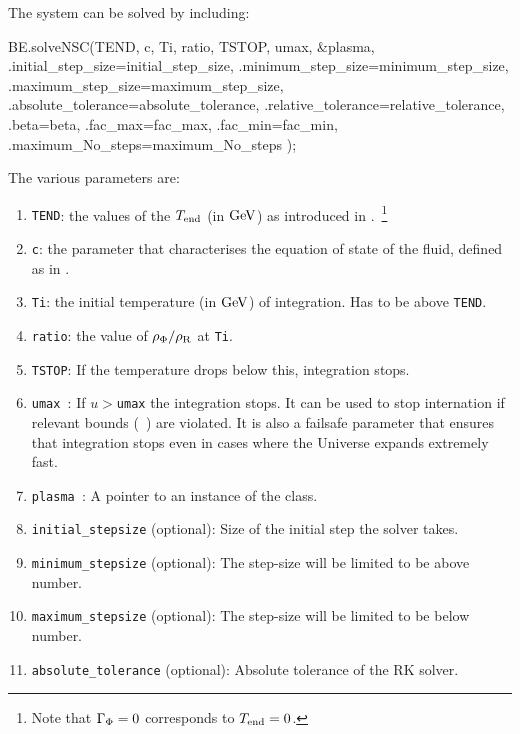 \documentclass[11pt,a4paper]{article}
\begin{document}
The system can be solved by including:
%
\begin{cpp}
	BE.solveNSC(TEND, c, Ti, ratio, TSTOP, umax, &plasma,
				 	 {
					 .initial_step_size=initial_step_size, .minimum_step_size=minimum_step_size,
					 .maximum_step_size=maximum_step_size, .absolute_tolerance=absolute_tolerance, 
					 .relative_tolerance=relative_tolerance, .beta=beta, 
					 .fac_max=fac_max, .fac_min=fac_min, .maximum_No_steps=maximum_No_steps
					 }
					);
\end{cpp}
%
The various parameters are:
%
\begin{enumerate}
	\item {\tt TEND}: the values of the $T_{\rm end}{}$ (in ${\rm GeV}$) as introduced in .~\footnote{Note that $\Gamma_{\Phi}=0$ corresponds to $T_{\rm end}{}=0$.}
	
	\item {\tt c}: the parameter that characterises the equation of state of the fluid, defined as in .
	
	\item {\tt Ti}: the initial temperature (in ${\rm GeV}$) of integration. Has to be above {\tt TEND}.
	
	\item {\tt ratio}: the value of $\rho_{\Phi}/\rho_{\rm R}$ at {\tt Ti}. 
	
	\item {\tt TSTOP}: If the temperature drops below this, integration stops. 
	
	\item {\tt umax }: If $u>${\tt umax} the integration stops. It can be used to stop internation if relevant bounds (\eg~\cite{Planck:2018jri}) are violated. It is also a failsafe parameter that ensures that integration stops even in cases where the Universe expands extremely fast.
	
	\item {\tt plasma }: A pointer to an instance of the  class.
	
	\item {\tt initial\_stepsize} (optional): Size of the initial step the solver takes. 
	
	\item {\tt minimum\_stepsize} (optional): The step-size will be limited to be above number. 
	
	\item {\tt maximum\_stepsize} (optional): The step-size will be limited to be below number. 
	
	\item {\tt absolute\_tolerance} (optional): Absolute tolerance of the RK solver.
	

\end{enumerate}
\end{document}

